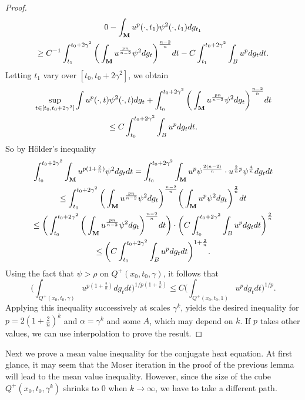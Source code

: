 \documentclass[11pt]{amsart}
\numberwithin{equation}{section}
\def\M{{\bf M}}
\numberwithin{equation}{section}
\begin{document}
\begin{proof}
\begin{multline*}
0 - \int_{\M} u^p(\cdot, t_1) \psi^2(\cdot, t_1) dg_{t_1}  \\
  \geq C^{-1} \int_{t_1}^{t_0 + 2\gamma^2}  \bigg( \int_{\M} u^{\frac{pn}{n-2}} \psi^2 dg_t \bigg)^{\frac{n-2}n} dt - C \int_{t_1}^{t_0 +  2 \gamma^2} \int_B u^p dg_t dt.
\end{multline*}
Letting $t_1$ vary over $[t_0, t_0 + 2\gamma^2]$, we obtain
\begin{multline*}
 \sup_{t \in [t_0, t_0 + 2\gamma^2]} \int u^p (\cdot, t) \psi^2 ( \cdot, t) dg_t +  \int_{t_0}^{t_0 + 2\gamma^2}  \bigg( \int_{\M} u^{\frac{pn}{n-2}} \psi^2 dg_t \bigg)^{\frac{n-2}n} dt \\ 
 \leq C  \int_{t_0}^{t_0+ 2\gamma^2} \int_Bu^p dg_t dt.
\end{multline*}
So by H\"older's inequality
\begin{multline*}
 \int_{t_0}^{t_0 + 2 \gamma^2}  \int_{\M} u^{p( 1 + \frac{2}n)} \psi^2 dg_t dt 
= \int_{t_0}^{t_0 + 2 \gamma^2}  \int_{\M} u^{p} \psi^{\frac{2(n-2)}{n}} \cdot u^{\frac{2}n p} \psi^{\frac{4}n} dg_t dt \\
\leq  \int_{t_0}^{t_0 + 2 \gamma^2} \bigg( \int_{\M} u^{\frac{pn}{n-2}} \psi^2 dg_t \bigg)^{\frac{n-2}{n}} \bigg( \int_{\M} u^p \psi^2 dg_t \bigg)^{\frac{2}n} dt \\
\leq  \bigg( \int_{t_0}^{t_0 + 2 \gamma^2} \bigg( \int_{\M} u^{\frac{pn}{n-2}} \psi^2 dg_t \bigg)^{\frac{n-2}{n}} dt \bigg) \cdot \bigg(C  \int_{t_0}^{t_0+ 2\gamma^2} \int_Bu^p dg_t dt \bigg)^{\frac{2}n}  \\
 \leq  \bigg( C \int_{t_0}^{t_0+ 2 \gamma^2} \int_B u^p dg_t dt \bigg)^{1 + \frac{2}n}.
\end{multline*}
Using the fact that $\psi > \rho$ on $Q^+(x_0, t_0, \gamma)$, it follows that
\[ \bigg( \int_{Q^+ (x_0, t_0, \gamma )} u^{p( 1 + \frac{2}n)} dg_t dt \bigg)^{1 / p( 1 + \frac{2}n)} \leq C \bigg( \int_{Q^+ (x_0, t_0, 1)} u^p dg_t dt \bigg)^{1/p}. \]
Applying this inequality successively at scales $\gamma^k$, yields the desired inequality for $p = 2(1 + \frac{2}n )^k$ and $\alpha = \gamma^k$ and some $A$, which may depend on $k$.
If $p$ takes other values, we can use interpolation to prove the result.
\end{proof}

Next we prove a mean value inequality for the conjugate heat
equation. At  first glance, it may seem that the Moser iteration in the proof of the previous lemma
will lead to the mean value inequality. However, since the size of the cube
$Q^+ (x_0, t_0, \gamma^k )$ shrinks to $0$ when $k \to \infty$, we have to take a different path.
\end{document}

